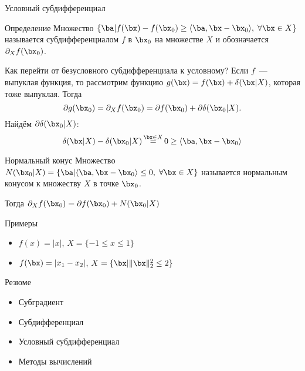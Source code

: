 \documentclass[12pt]{beamer}
\begin{document}
\begin{frame}{Условный субдифференциал}
\footnotesize
\begin{block}{Определение}
\footnotesize
Множество 
$
\{ \ba |  f(\bx) - f(\bx_0) \geq \langle \ba, \bx - \bx_0 \rangle, \; \forall \bx \in X \}
$ 
называется субдифференциалом $f$ в $\bx_0$ на множестве $X$ и обозначается $\partial_X f(\bx_0)$.
\end{block}
\begin{block}{Как перейти от безусловного субдифференциала к условному?}
\footnotesize
Если $f$~--- выпуклая функция, то рассмотрим функцию $g(\bx) = f(\bx) + \delta(\bx | X)$, которая тоже выпуклая.
Тогда
\vspace{-2mm} 
\[
\partial g (\bx_0) = \partial_X f(\bx_0) = \partial f(\bx_0) + \partial \delta(\bx_0 | X).
\vspace{-3mm} 
\]
Найдём $\partial \delta(\bx_0 | X)$:
\vspace{-3mm}
\[
\delta(\bx |X) - \delta(\bx_0 |X) \mathop{=}\limits^{\bx \in X} 0 \geq \langle \ba, \bx - \bx_0 \rangle
\]
\end{block}

\begin{block}{Нормальный конус}
\footnotesize
Множество $N(\bx_0 | X) = \{ \ba | \langle \ba, \bx - \bx_0 \rangle \leq 0, \; \forall \bx \in X \}$ называется нормальным конусом к множеству $X$ в точке $\bx_0$.
\end{block}
Тогда $\partial_X f(\bx_0) = \partial f(\bx_0) + N(\bx_0 | X)$  
\end{frame}

\begin{frame}{Примеры}
\begin{itemize}
\item $f(x) = |x|$, $X = \{-1 \leq x \leq 1 \}$
\item $f(\bx) = |x_1 - x_2|$, $X = \{ \bx | \| \bx \|^2_2 \leq 2 \}$
\end{itemize}
\end{frame}

\begin{frame}{Резюме}
\begin{itemize}
\item Субградиент
\item Субдифференциал
\item Условный субдифференциал
\item Методы вычислений
\end{itemize}
\end{frame}
\end{document}
